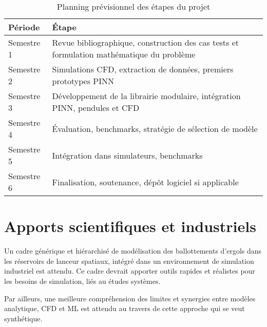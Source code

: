 \documentclass[12pt]{article}
\begin{document}
	\begin{table}[h]
		\centering
		\begin{tabularx}{\textwidth}{l X}
			
			\hline
			
			Période & Étape \\
			
			\hline
			
			Semestre 1 & Revue bibliographique, construction des cas tests et formulation mathématique du problème \\
			Semestre 2 & Simulations CFD, extraction de données, premiers prototypes PINN \\
			Semestre 3 & Développement de la librairie modulaire, intégration PINN, pendules et CFD \\
			Semestre 4 & Évaluation, benchmarks, stratégie de sélection de modèle \\
			Semestre 5 & Intégration dans simulateurs, benchmarks \\
			Semestre 6 & Finalisation, soutenance, dépôt logiciel si applicable \\
			
			\hline
			
		\end{tabularx}
		\caption{Planning prévisionnel des étapes du projet}
	\end{table}	
	
	\section*{Apports scientifiques et industriels}
	
	Un cadre générique et hiérarchisé de modélisation des ballottements d'ergols dans les réservoirs de lanceur spatiaux, intégré dans un environnement de simulation industriel est attendu. Ce cadre devrait apporter outils rapides et réalistes pour les besoins de simulation, liés au études systèmes.
	
	Par ailleurs, une meilleure compréhension des limites et synergies entre modèles analytique, CFD et ML est attendu au travers de cette approche qui se veut synthétique.
	
\end{document}
